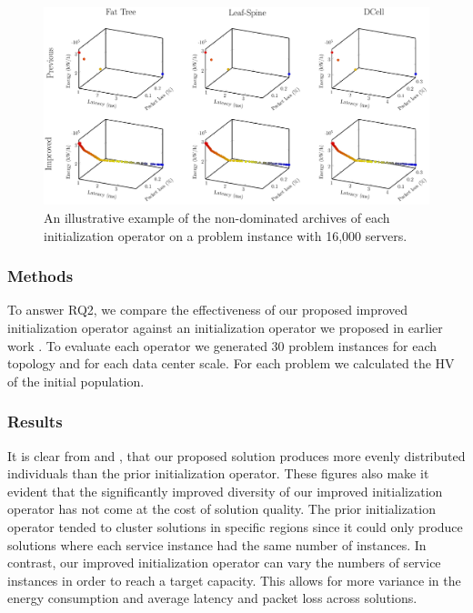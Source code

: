 \begin{figure}[t!]
    \includegraphics[width=\linewidth]{figures/graphs/initialization/pareto_fronts}

    \caption{An illustrative example of the non-dominated archives of each initialization operator on a problem instance with 16,000 servers.}
    \label{fig:init_pf}
\end{figure}

\subsubsection{Methods}
To answer RQ2, we compare the effectiveness of our proposed improved initialization operator against an initialization operator we proposed in earlier work \cite{BillingsleyLMMG22}. To evaluate each operator we generated 30 problem instances for each topology and for each data center scale. For each problem we calculated the HV of the initial population.

\subsubsection{Results}
It is clear from  and , that our proposed solution produces more evenly distributed individuals than the prior initialization operator. These figures also make it evident that the significantly improved diversity of our improved initialization operator has not come at the cost of solution quality. The prior initialization operator tended to cluster solutions in specific regions since it could only produce solutions where each service instance had the same number of instances. In contrast, our improved initialization operator can vary the numbers of service instances in order to reach a target capacity. This allows for more variance in the energy consumption and average latency and packet loss across solutions.


